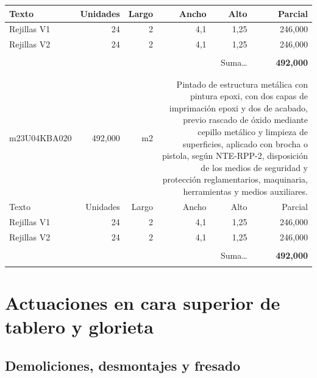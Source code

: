 \documentclass{book}%
\begin{document}
\begin{longtable}{lrrrrr}
Texto&Unidades&Largo&Ancho&Alto&Parcial\\%
\hline%
\multicolumn{1}{p{3.5cm}}{Rejillas V1}&24&2&4,1&1,25&   246,000\\%
\multicolumn{1}{p{3.5cm}}{Rejillas V2}&24&2&4,1&1,25&   246,000\\%
&&&&&\\%
\multicolumn{5}{r}{Suma\ldots}&\textbf{   492,000}\\%
\hline%
&&&&&\\%
&&&&&\\%
m23U04KBA020&   492,000& m2&\multicolumn{3}{p{6cm}}{\scriptsize Pintado de estructura metálica con pintura epoxi, con dos capas de imprimación epoxi y dos de acabado, previo rascado de óxido mediante cepillo metálico y limpieza de superficies, aplicado con brocha o pistola, según NTE-RPP-2, disposición de los medios de seguridad y protección reglamentarios, maquinaria, herramientas y medios auxiliares.\normalsize}\\%
Texto&Unidades&Largo&Ancho&Alto&Parcial\\%
\hline%
\multicolumn{1}{p{3.5cm}}{Rejillas V1}&24&2&4,1&1,25&   246,000\\%
\multicolumn{1}{p{3.5cm}}{Rejillas V2}&24&2&4,1&1,25&   246,000\\%
&&&&&\\%
\multicolumn{5}{r}{Suma\ldots}&\textbf{   492,000}\\%
\hline%
&&&&&\\%
\end{longtable}%
\newpage

%
\section{Actuaciones en cara superior de tablero y glorieta}%
\subsection{Demoliciones, desmontajes y fresado}%
\end{document}
